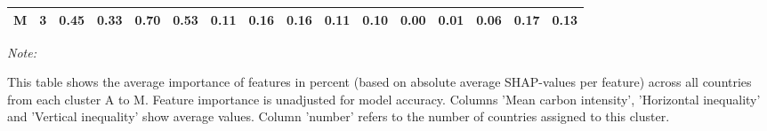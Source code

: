 \begin{table}[H]
{\begin{threeparttable}
\begin{tabular}[t]{lrrrrrrrrrrrrrrr}
M & 3 & 0.45 & 0.33 & 0.70 & 0.53 & 0.11 & 0.16 & 0.16 & 0.11 & 0.10 & 0.00 & 0.01 & 0.06 & 0.17 & 0.13\\
\bottomrule
\end{tabular}
\begin{tablenotes}
\item \textit{Note: } 
\item This table shows the average importance of features in percent (based on absolute average SHAP-values per feature) across all countries from each cluster A to M. Feature importance is unadjusted for model accuracy. Columns 'Mean carbon intensity', 'Horizontal inequality' and 'Vertical inequality' show average values. Column 'number' refers to the number of countries assigned to this cluster.
\end{tablenotes}
\end{threeparttable}}
\end{table}
